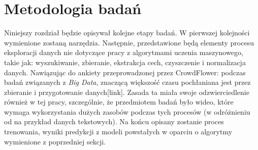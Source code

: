 
\chapter{Metodologia badań}
Niniejszy rozdział będzie opisywał kolejne etapy badań. W pierwszej kolejności wymienione zostaną narzędzia. Następnie, przedstawione będą elementy procesu eksploracji danych nie dotyczące pracy z algorytmami uczenia maszynowego, takie jak: wyszukiwanie, zbieranie, ekstrakcja cech, czyszczenie i normalizacja danych. Nawiązując do ankiety przeprowadzonej przez CrowdFlower: podczas badań związanych z {\em Big Data}, znaczącą większość czasu pochłaniana jest przez zbieranie i przygotowanie danych[link]. Zasada ta miała swoje odzwierciedlenie również w tej pracy, szczególnie, że przedmiotem badań było wideo, które wymaga wykorzystania dużych zasobów podczas tych procesów (w odróżnieniu od na przykład danych tekstowych). Na końcu opisany zostanie proces trenowania, wyniki predykcji z modeli powstałych w oparciu o algorytmy wymienione z poprzedniej sekcji.
\label{cha:pierwszyDokument}

